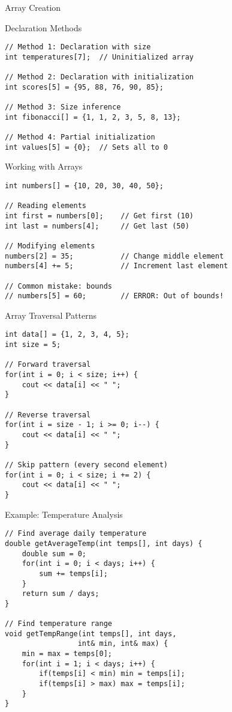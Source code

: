 \documentclass{beamer}
\begin{document}
\begin{frame}[fragile]{Array Creation}
    \begin{block}{Declaration Methods}
        \begin{lstlisting}
// Method 1: Declaration with size
int temperatures[7];  // Uninitialized array

// Method 2: Declaration with initialization
int scores[5] = {95, 88, 76, 90, 85};

// Method 3: Size inference
int fibonacci[] = {1, 1, 2, 3, 5, 8, 13};

// Method 4: Partial initialization
int values[5] = {0};  // Sets all to 0
        \end{lstlisting}
    \end{block}
\end{frame}

\begin{frame}[fragile]{Working with Arrays}
    \begin{lstlisting}
int numbers[] = {10, 20, 30, 40, 50};

// Reading elements
int first = numbers[0];    // Get first (10)
int last = numbers[4];     // Get last (50)

// Modifying elements
numbers[2] = 35;           // Change middle element
numbers[4] += 5;           // Increment last element

// Common mistake: bounds
// numbers[5] = 60;        // ERROR: Out of bounds!
    \end{lstlisting}
\end{frame}

\begin{frame}[fragile]{Array Traversal Patterns}
    \begin{lstlisting}
int data[] = {1, 2, 3, 4, 5};
int size = 5;

// Forward traversal
for(int i = 0; i < size; i++) {
    cout << data[i] << " ";
}

// Reverse traversal
for(int i = size - 1; i >= 0; i--) {
    cout << data[i] << " ";
}

// Skip pattern (every second element)
for(int i = 0; i < size; i += 2) {
    cout << data[i] << " ";
}
    \end{lstlisting}
\end{frame}

\begin{frame}[fragile]{Example: Temperature Analysis}
    \begin{lstlisting}
// Find average daily temperature
double getAverageTemp(int temps[], int days) {
    double sum = 0;
    for(int i = 0; i < days; i++) {
        sum += temps[i];
    }
    return sum / days;
}

// Find temperature range
void getTempRange(int temps[], int days, 
                 int& min, int& max) {
    min = max = temps[0];
    for(int i = 1; i < days; i++) {
        if(temps[i] < min) min = temps[i];
        if(temps[i] > max) max = temps[i];
    }
}
    \end{lstlisting}
\end{frame}
\end{document}
